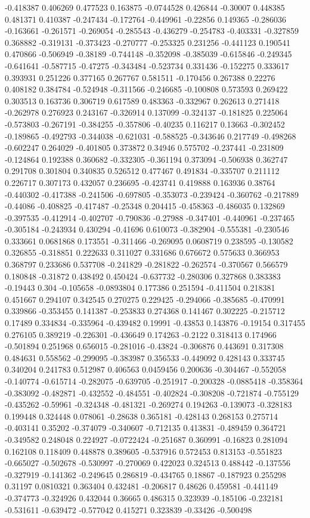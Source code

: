 -0.418387 0.406269 0.477523 0.163875 -0.0744528 0.426844 -0.30007 0.448385 0.481371 0.410387 -0.247434 -0.172764 -0.449961 -0.22856 0.149365 -0.286036 -0.163661 -0.261571 -0.269054 -0.285543 -0.436279 -0.254783 -0.403331 -0.327859 0.368882 -0.319131 -0.373423 -0.270777 -0.253325 0.231256 -0.441123 0.190541 0.470866 -0.506949 -0.38189 -0.744148 -0.352098 -0.385039 -0.615846 -0.249345 -0.641641 -0.587715 -0.47275 -0.343484 -0.523734 0.331436 -0.152275 0.333617 0.393931 0.251226 0.377165 0.267767 0.581511 -0.170456 0.267388 0.22276 0.408182 0.384784 -0.524948 -0.311566 -0.246685 -0.100808 0.573593 0.269422 0.303513 0.163736 0.306719 0.617589 0.483363 -0.332967 0.262613 0.271418 -0.262978 0.276923 0.243167 -0.326914 0.137099 -0.324137 -0.181825 0.225064 -0.573803 -0.267191 -0.384255 -0.357806 -0.40235 0.116217 0.13663 -0.302452 -0.189865 -0.492793 -0.344038 -0.621031 -0.588525 -0.343646 0.217749 -0.498268 -0.602247 0.264029 -0.401805 0.373872 0.34946 0.575702 -0.237441 -0.231809 -0.124864 0.192388 0.360682 -0.332305 -0.361194 0.373094 -0.506938 0.362747 0.291708 0.301804 0.340835 0.526512 0.477467 0.491834 -0.335707 0.211112 0.226717 0.307173 0.432057 0.236695 -0.423741 0.419888 0.163936 0.38764 -0.440302 -0.417388 -0.241506 -0.697805 -0.353073 -0.239424 -0.360762 -0.217889 -0.44086 -0.408825 -0.417487 -0.25348 0.204415 -0.458363 -0.486035 0.132869 -0.397535 -0.412914 -0.402707 -0.790836 -0.27988 -0.347401 -0.440961 -0.237465 -0.305184 -0.243934 0.430294 -0.41696 0.610073 -0.382904 -0.555381 -0.230546 0.333661 0.0681868 0.173551 -0.311466 -0.269095 0.0608719 0.238595 -0.130582 0.326855 -0.318851 0.222633 0.311027 0.331686 0.676672 0.575633 0.366953 0.368797 0.233686 0.537708 -0.241829 -0.281822 -0.262574 -0.370567 0.566579 0.180848 -0.31872 0.438492 0.450424 -0.637732 -0.280306 0.327868 0.383383 -0.19443 0.304 -0.105658 -0.0893804 0.177386 0.251594 -0.411504 0.218381 0.451667 0.294107 0.342545 0.270275 0.229425 -0.294066 -0.385685 -0.470991 0.339866 -0.353455 0.141387 -0.253833 0.274368 0.141467 0.302225 -0.215712 0.17489 0.334834 -0.335964 -0.439482 0.19991 -0.43853 0.143876 -0.19154 0.317455 0.276105 0.389219 -0.226301 -0.436649 0.174263 -0.2122 0.318413 0.174966 -0.501894 0.251968 0.656015 -0.281016 -0.43824 -0.306876 0.443691 0.317308 0.484631 0.558562 -0.299095 -0.383987 0.356533 -0.449092 0.428143 0.333745 0.340204 0.241783 0.512987 0.406563 0.0459456 0.200636 -0.304467 -0.552058 -0.140774 -0.615714 -0.282075 -0.639705 -0.251917 -0.200328 -0.0885418 -0.358364 -0.383092 -0.482871 -0.432552 -0.484551 -0.402824 -0.308208 -0.721874 -0.755129 -0.435262 -0.59961 -0.324348 -0.481321 -0.269274 0.194263 -0.139073 -0.328183 0.199448 0.324448 0.078061 -0.28638 0.365181 -0.428143 0.268153 0.275714 -0.403141 0.35202 -0.374079 -0.340607 -0.712135 0.413831 -0.489459 0.364721 -0.349582 0.248048 0.224927 -0.0722424 -0.251687 0.360991 -0.16823 0.281094 0.162108 0.118409 0.448878 0.389605 -0.537916 0.572453 0.813153 -0.551823 -0.665027 -0.502678 -0.530997 -0.270069 0.422023 0.324513 0.488442 -0.137556 -0.327919 -0.141362 -0.249645 0.286819 -0.434765 0.18867 -0.187923 0.255298 0.31197 0.0810321 0.363404 0.432481 -0.206817 0.48626 0.459581 -0.441149 -0.374773 -0.324926 0.432044 0.36665 0.486315 0.323939 -0.185106 -0.232181 -0.531611 -0.639472 -0.577042 0.415271 0.323839 -0.33426 -0.500498 